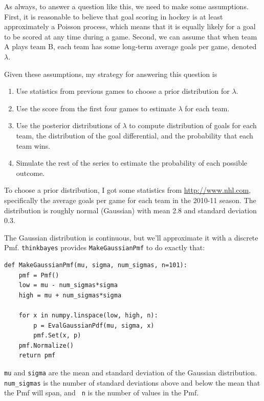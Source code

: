 \documentclass[12pt]{book}
\begin{document}
As always, to answer a question like this, we need to make some
assumptions.  First, it is reasonable to believe that goal scoring in
hockey is at least approximately a Poisson process, which means that
it is equally likely for a goal to be scored at any time during a
game.  Second, we can assume that when team A plays team B, each team
has some long-term average goals per game, denoted $\lambda$.

Given these assumptions, my strategy for answering this question is

\begin{enumerate}

\item Use statistics from previous games to choose a prior
distribution for $\lambda$.

\item Use the score from the first four games to estimate $\lambda$
for each team.

\item Use the posterior distributions of $\lambda$ to compute 
distribution of goals for each team, the distribution of the
goal differential, and the probability that each team wins.

\item Simulate the rest of the series to estimate the probability
of each possible outcome.

\end{enumerate}

To choose a prior distribution, I got some statistics from
\url{http://www.nhl.com}, specifically the average goals per game
for each team in the 2010-11 season.  The distribution is roughly
normal (Gaussian) with mean 2.8 and standard deviation 0.3.

The Gaussian distribution is continuous, but we'll approximate it with
a discrete Pmf.  \verb"thinkbayes" provides \verb"MakeGaussianPmf" to
do exactly that:

\begin{verbatim}
def MakeGaussianPmf(mu, sigma, num_sigmas, n=101):
    pmf = Pmf()
    low = mu - num_sigmas*sigma
    high = mu + num_sigmas*sigma

    for x in numpy.linspace(low, high, n):
        p = EvalGaussianPdf(mu, sigma, x)
        pmf.Set(x, p)
    pmf.Normalize()
    return pmf
\end{verbatim}  

{\tt mu} and {\tt sigma} are the mean and standard deviation of the
Gaussian distribution.  \verb"num_sigmas" is the number of standard
deviations above and below the mean that the Pmf will span, and {\tt
  n} is the number of values in the Pmf.
\end{document}
